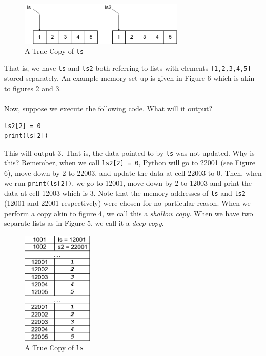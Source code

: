 \documentclass{article}
\begin{document}
\newpage

\begin{figure}[hbt]
    \centering
    \includegraphics[width=0.7\textwidth]{pointer_diagram_5.png}
    \caption{A True Copy of \texttt{ls}}
    \label{fig:my_label}
\end{figure}

\noindent That is, we have \texttt{ls} and \texttt{ls2} both referring to lists with elements \texttt{[1,2,3,4,5]} stored separately. An example memory set up is given in Figure 6 which is akin to figures 2 and 3.\\\\
Now, suppose we execute the following code. What will it output?
\begin{verbatim}
ls2[2] = 0
print(ls[2])
\end{verbatim}
This will output 3. That is, the data pointed to by \texttt{ls} was not updated. Why is this? Remember, when we call \texttt{ls2[2] = 0}, Python will go to 22001 (see Figure 6), move down by 2 to 22003, and update the data at cell 22003 to 0. Then, when we run \texttt{print(ls[2])}, we go to 12001, move down by 2 to 12003 and print the data at cell 12003 which is 3. Note that the memory addresses of \texttt{ls} and \texttt{ls2} (12001 and 22001 respectively) were chosen for no particular reason. When we perform a copy akin to figure 4, we call this a \textit{shallow copy}. When we have two separate lists as in Figure 5, we call it a \textit{deep copy}. 
\begin{figure}[hbt]
    \centering
    \includegraphics[width=0.3\textwidth]{pointer_diagram_6.png}
    \caption{A True Copy of \texttt{ls}}
    \label{fig:my_label}
\end{figure}\\
\end{document}
